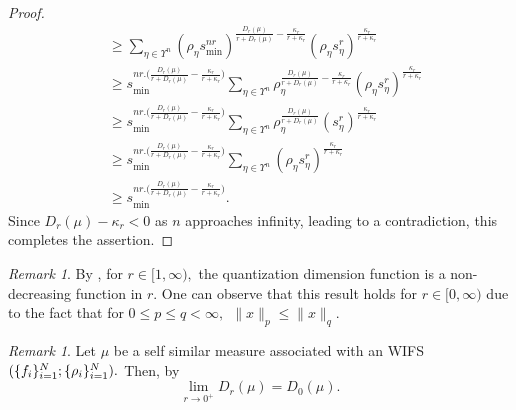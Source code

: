 \documentclass{amsproc}
\theoremstyle{definition}
\theoremstyle{remark}
\newtheorem{remark}[theorem]{Remark}
\numberwithin{equation}{section}
\begin{document}
\begin{proof}
\begin{align*}
& \ge  \sum_{\eta \in \Upsilon^n} (\rho_{\eta}  s_{\min}^{nr})^{\frac{D_r(\mu) }{r + D_r(\mu)}- \frac{\kappa_{r}}{r + \kappa_{r}}} (\rho_{\eta}  s_{ \eta}^r)^{\frac{\kappa_{r}}{r + \kappa_{r}}} \\
& \ge  s_{\min}^{nr. \bigg({\frac{D_r(\mu) }{r + D_r(\mu)}- \frac{\kappa_{r}}{r + \kappa_{r}}}\bigg)}  \sum_{\eta \in \Upsilon^n} \rho_{\eta}^{\frac{D_r(\mu) }{r + D_r(\mu)}- \frac{\kappa_{r}}{r + \kappa_{r}}} (\rho_{\eta}  s_{ \eta}^r)^{\frac{\kappa_{r}}{r + \kappa_{r}}} \\ 
 & \ge s_{\min}^{nr. \bigg({\frac{D_r(\mu) }{r + D_r(\mu)}- \frac{\kappa_{r}}{r + \kappa_{r}}}\bigg)}  \sum_{\eta \in \Upsilon^n} \rho_{\eta}^{\frac{D_r(\mu) }{r + D_r(\mu)}} (s_{ \eta}^r)^{\frac{\kappa_{r}}{r + \kappa_{r}}}
\\
&  \ge  s_{\min}^{nr. \bigg({\frac{D_r(\mu) }{r + D_r(\mu)}- \frac{\kappa_{r}}{r + \kappa_{r}}}\bigg)} \sum_{\eta \in \Upsilon^n}( \rho_{\eta} s_{ \eta}^r)^{\frac{\kappa_{r}}{r + \kappa_{r}}}\\ & \ge s_{\min}^{nr. \bigg({\frac{D_r(\mu) }{r + D_r(\mu)}- \frac{\kappa_{r}}{r + \kappa_{r}}}\bigg)}.
 \end{align*}
Since $D_r(\mu)- \kappa_r < 0$ as $n$ approaches infinity, leading to a contradiction, this completes the assertion.
\end{proof}
\begin{remark}
    By \cite[Corollary 11.4]{GL1}, for $r \in [1, \infty),$ the quantization dimension function is a non-decreasing function in $r$. One can observe that this result holds for $r \in [0, \infty)$ due to the fact that for $0 \le p \le q < \infty, ~~ \|x\|_{p} \le \|x\|_{q}.$
\end{remark}
\begin{remark}
    Let $\mu$ be a self similar measure associated with an WIFS $(\{f_i\}_{i=1}^N;\\ \{\rho_i\}_{i=1}^N).$ Then, by \cite[Lemma 3.5]{GL3} $$\lim_{r \to 0^+} D_r(\mu)= D_{0}(\mu).$$
  \end{remark}
\end{document}
